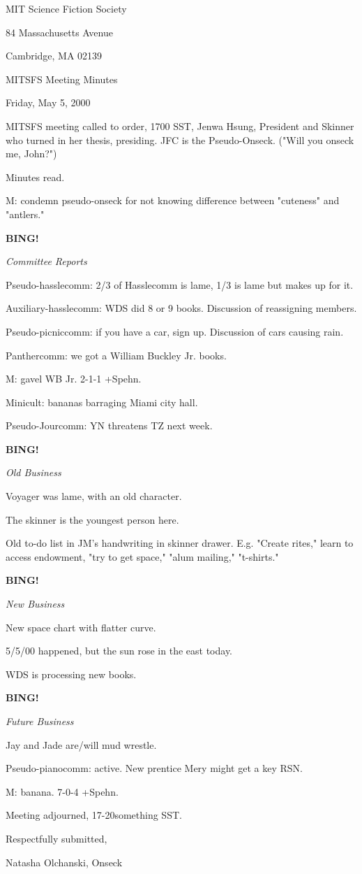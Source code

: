 \documentclass[12pt]{article}
\newcommand{\bing}{{\bf BING!} }
\newcommand{\goto}[1]{\bing \vskip 12pt \centerline{{\em{#1}}}}
\begin{document}
\begin{center}

MIT Science Fiction Society 

84 Massachusetts Avenue

Cambridge, MA 02139

\vspace{12pt}

MITSFS Meeting Minutes 

Friday, May 5, 2000

\end{center}
 
\vspace{18pt}

\setlength{\parskip}{6pt}

\noindent
MITSFS meeting called to order, 1700 SST, Jenwa Hsung, President and
Skinner who turned in her thesis, presiding. JFC is the Pseudo-Onseck. ("Will you onseck me, John?")

Minutes read.

M: condemn pseudo-onseck for not knowing difference between "cuteness" and "antlers."

\goto{Committee Reports}

Pseudo-hasslecomm: 2/3 of Hasslecomm is lame, 1/3 is lame but makes up for it.

Auxiliary-hasslecomm: WDS did 8 or 9 books. Discussion of reassigning members.

Pseudo-picniccomm: if you have a car, sign up. Discussion of cars causing rain.

Panthercomm: we got a William Buckley Jr. books.

M: gavel WB Jr. 2-1-1 +Spehn.

Minicult: bananas barraging Miami city hall.

Pseudo-Jourcomm: YN threatens TZ next week.

\goto{Old Business}

Voyager was lame, with an old character.

The skinner is the youngest person here.

Old to-do list in JM's handwriting in skinner drawer. E.g. "Create rites," learn to access endowment, "try to get space," "alum mailing," "t-shirts."

\goto{New Business}

New space chart with flatter curve.

5/5/00 happened, but the sun rose in the east today.

WDS is processing new books.

\goto{Future Business}

Jay and Jade are/will mud wrestle.

Pseudo-pianocomm: active. New prentice Mery might get a key RSN.

M: banana. 7-0-4 +Spehn.

\vspace{12pt}

\noindent
Meeting adjourned, 17-20something SST.

\vspace{18pt}

\centerline{Respectfully submitted,}
\centerline{Natasha Olchanski, Onseck}
\end{document}
